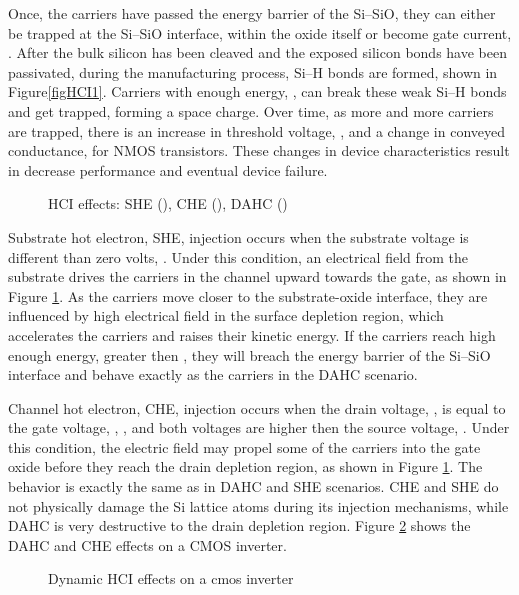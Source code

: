 \documentclass[12pt,conference]{IEEEtran}
\begin{document}
Once, the carriers have passed the energy barrier
of the Si--SiO, they can either be trapped at the Si--SiO
interface, within the oxide itself or  become gate current, .
After the bulk silicon has been cleaved  and the exposed silicon bonds have been passivated,
during the manufacturing process, Si--H bonds are formed,
shown in Figure\ref{figHCI1}. Carriers with enough energy,
, can break these weak Si--H bonds and get trapped,
forming a space charge.
Over time, as more and more carriers are trapped, there is an increase in  threshold voltage, ,
and a change in  conveyed conductance,  for NMOS transistors.
These changes in device characteristics result in decrease performance and eventual device failure.      
\begin{figure}[htp]
\caption{HCI effects: SHE (), CHE (), DAHC ()}
\label{figHCI2}
\end{figure}


Substrate hot electron, SHE, injection occurs when the substrate voltage
is different than zero volts, .
Under this condition, an electrical field from the substrate drives
the carriers in the channel upward towards the gate,
as shown in Figure \ref{figHCI2}.
As the carriers move closer to the substrate-oxide interface,
they are influenced by high electrical field in the surface depletion region,
which accelerates the carriers and raises their kinetic energy.
If the carriers reach high enough energy, greater then ,
they will breach the energy barrier of the Si--SiO interface
and behave exactly as the carriers in the DAHC scenario.  

Channel hot electron, CHE, injection occurs when the drain voltage,
, is equal to the gate voltage, , ,
and both voltages are higher then the source voltage, .
Under this condition, the electric field may propel some of
the carriers into the gate oxide before they reach the drain
depletion region, as shown in Figure \ref{figHCI2}.
The behavior is exactly the same as in DAHC and SHE scenarios.
CHE and SHE do not physically damage the Si lattice atoms
during its injection mechanisms, while DAHC is very destructive
to the drain depletion region.    Figure \ref{figINVERTER} shows the DAHC and CHE effects on a 
CMOS inverter.

\begin{figure}[htp]
\caption{Dynamic HCI effects on a cmos inverter}
\label{figINVERTER}
\end{figure}
\end{document}
